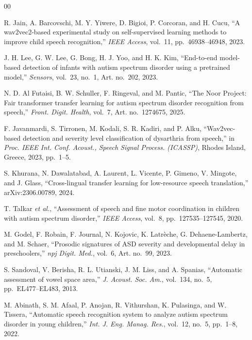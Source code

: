 \documentclass[conference]{IEEEtran}
\begin{document}
\begin{thebibliography}{00}

 R. Jain, A. Barcovschi, M. Y. Yiwere, D. Bigioi, P. Corcoran, and H. Cucu, ``A wav2vec2-based experimental study on self-supervised learning methods to improve child speech recognition,'' \textit{IEEE Access}, vol.~11, pp.~46938--46948, 2023.

 J. H. Lee, G. W. Lee, G. Bong, H. J. Yoo, and H. K. Kim, ``End-to-end model-based detection of infants with autism spectrum disorder using a pretrained model,'' \textit{Sensors}, vol.~23, no.~1, Art. no.~202, 2023.

 N. D. Al Futaisi, B. W. Schuller, F. Ringeval, and M. Pantic, ``The Noor Project: Fair transformer transfer learning for autism spectrum disorder recognition from speech,'' \textit{Front. Digit. Health}, vol.~7, Art. no.~1274675, 2025.

 F. Javanmardi, S. Tirronen, M. Kodali, S. R. Kadiri, and P. Alku, ``Wav2vec-based detection and severity level classification of dysarthria from speech,'' in \textit{Proc. IEEE Int. Conf. Acoust., Speech Signal Process. (ICASSP)}, Rhodes Island, Greece, 2023, pp.~1--5.

 S. Khurana, N. Dawalatabad, A. Laurent, L. Vicente, P. Gimeno, V. Mingote, and J. Glass, ``Cross-lingual transfer learning for low-resource speech translation,'' arXiv:2306.00789, 2024.

 T. Talkar \textit{et al.}, ``Assessment of speech and fine motor coordination in children with autism spectrum disorder,'' \textit{IEEE Access}, vol.~8, pp.~127535--127545, 2020.

 M. Godel, F. Robain, F. Journal, N. Kojovic, K. Latr\`eche, G. Dehaene-Lambertz, and M. Schaer, ``Prosodic signatures of ASD severity and developmental delay in preschoolers,'' \textit{npj Digit. Med.}, vol.~6, Art. no.~99, 2023.

 S. Sandoval, V. Berisha, R. L. Utianski, J. M. Liss, and A. Spanias, ``Automatic assessment of vowel space area,'' \textit{J. Acoust. Soc. Am.}, vol.~134, no.~5, pp.~EL477--EL483, 2013.

 M. Abinath, S. M. Afaal, P. Anojan, R. Vithurshan, K. Pulasinga, and W. Tissera, ``Automatic speech recognition system to analyze autism spectrum disorder in young children,'' \textit{Int. J. Eng. Manag. Res.}, vol.~12, no.~5, pp.~1--8, 2022.


\end{thebibliography}
\end{document}

